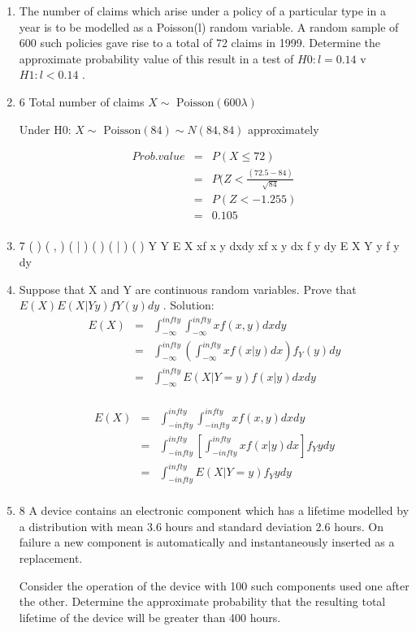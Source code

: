 \documentclass[a4paper,12pt]{article}
\begin{document}
\begin{enumerate}
\item The number of claims which arise under a policy of a particular type in a year
is to be modelled as a Poisson(l) random variable. A random sample of 600
such policies gave rise to a total of 72 claims in 1999.
Determine the approximate probability value of this result in a test of
$H0 : l = 0.14$ v $H1 : l < 0.14$ .
\item 6 
Total number of claims $X \sim \mbox{ Poisson}(600\lambda)$

Under H0: $X \sim \mbox{ Poisson}(84) \sim N(84,84)$ approximately

\begin{eqnarray*}
Prob. value &=& P(X \leq 72) \\
&=& P(Z < \frac{(72.5 - 84)}{\sqrt{84}} \\
&=& P(Z < -1.255) \\ 
&=& 0.105\\
\end{eqnarray*}
\item 7 ( ) ( , ) ( | ) ( ) ( | ) ( ) Y Y E X xf x y dxdy xf x y dx f y dy E X Y y f y dy

\item Suppose that X and Y are continuous random variables.
Prove that $E(X ) E(X|Y y)fY( y)dy$ .
Solution: 
\begin{eqnarray*}
E(X)&=&  \int^{infty}_{-\infty} \int^{infty}_{-\infty} x f(x,y) dx dy\\
&=&  \int^{infty}_{-\infty} \left( \int^{infty}_{-\infty} x f(x|y) dx \right) f_Y(y) dy\\
&=&  \int^{infty}_{-\infty} E(X|Y=y) f(x|y) dx dy\\
\end{eqnarray*}

\begin{eqnarray*} 
E(X) &=& \int^{infty}_{-infty} \int^{infty}_{-infty}x f(x,y) dx dy \\
&=& \int^{infty}_{-infty} \left[ \int^{infty}_{-infty}x f(x|y) dx \right] f_Y{y} dy \\
&=& \int^{infty}_{-infty} E(X|Y=y) f_Y{y} dy \\
\end{eqnarray*}
\newpage
\item 8 A device contains an electronic component which has a lifetime modelled by a distribution with mean 3.6 hours and standard deviation 2.6 hours. On failure a new component is automatically and instantaneously inserted as a replacement.


Consider the operation of the device with 100 such components used one after
the other. Determine the approximate probability that the resulting total
lifetime of the device will be greater than 400 hours. 

\end{enumerate}
\end{document}

